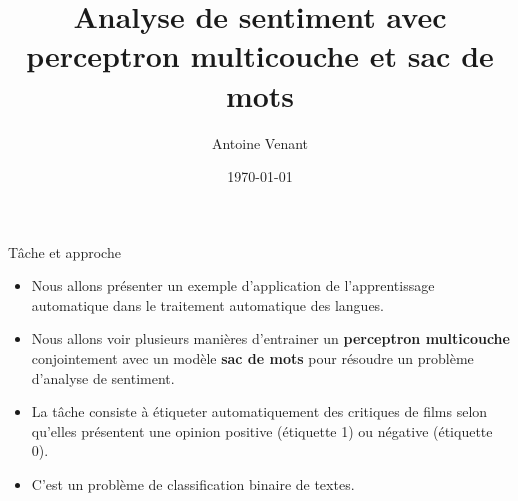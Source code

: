 \documentclass{beamer}
\begin{document}



\title{Analyse de sentiment avec perceptron multicouche et sac de mots} 
\author{Antoine Venant}
\date{\today}
\maketitle

\begin{frame}{T\^ache et approche}
  \begin{itemize}
  \item Nous allons pr\'esenter un exemple d'application de l'apprentissage automatique dans le traitement automatique des langues.
  \item Nous allons voir plusieurs mani\`eres d'entrainer un {\bf perceptron multicouche} conjointement avec un mod\`ele {\bf sac de mots} pour r\'esoudre un probl\`eme d'analyse de sentiment.
  \item La t\^ache consiste \`a \'etiqueter automatiquement des critiques de films selon qu'elles pr\'esentent une opinion positive (\'etiquette 1) ou n\'egative (\'etiquette 0).
  \item C'est un probl\`eme de classification binaire de textes. 
  \end{itemize}    
\end{frame}
\end{document}
